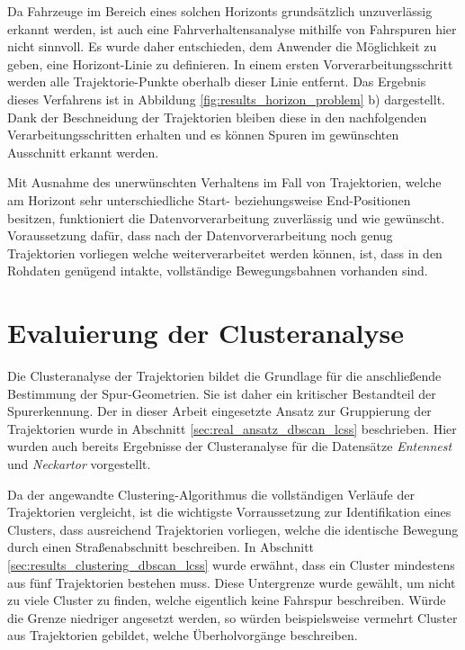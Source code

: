 Da Fahrzeuge im Bereich eines solchen Horizonts grundsätzlich unzuverlässig erkannt werden, ist auch eine Fahrverhaltensanalyse
mithilfe von Fahrspuren hier nicht sinnvoll. Es wurde daher entschieden, dem Anwender die Möglichkeit zu geben, eine
Horizont-Linie zu definieren. In einem ersten Vorverarbeitungsschritt werden alle Trajektorie-Punkte oberhalb dieser
Linie entfernt. Das Ergebnis dieses Verfahrens ist in Abbildung \ref{fig:results_horizon_problem} b)
dargestellt. Dank der Beschneidung der Trajektorien bleiben diese in den nachfolgenden Verarbeitungsschritten
erhalten und es können Spuren im gewünschten Ausschnitt erkannt werden.

Mit Ausnahme des unerwünschten Verhaltens im Fall von Trajektorien, welche am Horizont sehr unterschiedliche Start-
beziehungsweise End-Positionen besitzen, funktioniert die Datenvorverarbeitung zuverlässig und wie gewünscht.
Voraussetzung dafür, dass nach der Datenvorverarbeitung
noch genug Trajektorien vorliegen welche weiterverarbeitet werden können, ist, dass in
den Rohdaten genügend intakte, vollständige Bewegungsbahnen vorhanden sind.

\section{Evaluierung der Clusteranalyse}
\label{sec:results_eval_clustering}

Die Clusteranalyse der Trajektorien bildet die Grundlage für die anschließende Bestimmung der Spur-Geometrien.
Sie ist daher ein kritischer Bestandteil der Spurerkennung. Der in dieser Arbeit eingesetzte Ansatz zur
Gruppierung der Trajektorien wurde in Abschnitt \ref{sec:real_ansatz_dbscan_lcss} beschrieben.
Hier wurden auch bereits Ergebnisse der Clusteranalyse für die Datensätze \textit{Entennest} und
\textit{Neckartor} vorgestellt.

Da der angewandte Clustering-Algorithmus die vollständigen Verläufe der
Trajektorien vergleicht, ist die wichtigste Vorraussetzung zur Identifikation eines Clusters, dass ausreichend
Trajektorien vorliegen, welche die identische Bewegung durch einen Straßenabschnitt beschreiben.
In Abschnitt \ref{sec:results_clustering_dbscan_lcss} wurde erwähnt, dass ein Cluster mindestens aus
fünf Trajektorien bestehen muss. Diese Untergrenze wurde gewählt, um nicht zu viele Cluster zu finden, welche
eigentlich keine Fahrspur beschreiben. Würde die Grenze niedriger angesetzt werden, so würden beispielsweise
vermehrt Cluster aus Trajektorien gebildet, welche Überholvorgänge beschreiben.

